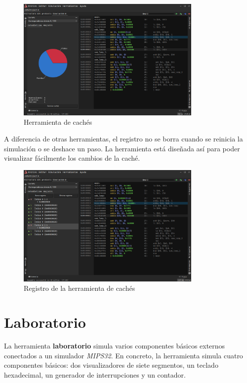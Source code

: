 \begin{figure}[H]
    \centering
    \includegraphics[width=0.8\textwidth]{images/tools/jams-caches}
    \caption{Herramienta de cachés}
    \label{fig:jams-caches-stats}
\end{figure}

\noindent A diferencia de otras herramientas, el registro no se
borra cuando se reinicia la simulación o se deshace un paso.
La herramienta está diseñada así para poder visualizar fácilmente los cambios de la caché.

\begin{figure}[H]
    \centering
    \includegraphics[width=0.8\textwidth]{images/tools/jams-caches-log}
    \caption{Registro de la herramienta de cachés}
    \label{fig:jams-caches-log}
\end{figure}

\section{Laboratorio}\label{sec:laboratorio}

La herramienta \textbf{laboratorio} simula varios componentes básicos
externos conectados a un simulador \textit{MIPS32}.
En concreto, la herramienta simula cuatro componentes básicos:
dos visualizadores de siete segmentos, un teclado hexadecimal,
un generador de interrupciones y un contador.

